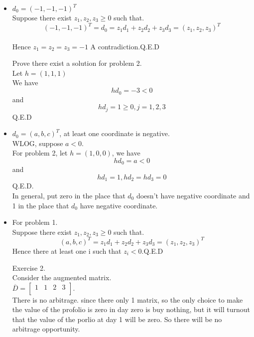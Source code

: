 \documentclass[12pt]{article}
\newcommand{\ol}{\overline}
\begin{document}
\begin{itemize}
\item $d_{0} = (-1,-1,-1)^{T}$\\
Suppose there exist $z_{1},z_{2},z_{3} \geq 0$ such that.\\
$$(-1,-1,-1)^{T} = d_{0} = z_{1}d_{1}+z_{2}d_{2}
+z_{3}d_{3} = (z_{1},z_{2},z_{3})^{T}$$\\
Hence $z_{1}=z_{2}=z_{3}=-1$ A contradiction.Q.E.D

Prove there exist a solution for problem 2.\\
Let $h=(1,1,1)$\\
We have
$$hd_{0} = -3<0 $$ and\\
$$hd_{j}  = 1 \geq 0, j =1,2,3 $$Q.E.D

\item $d_{0} = (a,b,c)^{T}$, at least one coordinate is negative.\\
WLOG, suppose $a < 0$.\\
For problem 2, let $h = (1,0,0)$, we have\\
$$hd_{0} = a < 0 $$ and\\
$$hd_{1} = 1, hd_{2} = hd_{3} =0 $$ Q.E.D.\\
In general, put zero in the place that $d_{0} $ doesn't have negative coordinate and 1 in the place that $d_{0} $ have negative coordinate.\\
\item For problem 1.\\
Suppose there exist $z_{1},z_{2},z_{3} \geq 0$ such that.\\
$$(a,b,c)^{T} = z_{1}d_{1}+z_{2}d_{2}+z_{3}d_{3}= (z_{1},z_{2},z_{3})^{T}$$
Hence there at least one i such that $z_{i}<0$.Q.E.D


















Exercise 2.\\
 Consider the augmented matrix.\\
 
  $\ol{D}=
    \left[\begin{array}{llll}
    1 & 1 & 2 & 3\\
    \end{array}
    \right].$ 
    \\
    
    There is no arbitrage. since there only 1 matrix, so the only choice to make the value of the profolio is zero in day zero is buy nothing, but it will turnout that the value of the porlio at day 1 will be zero. So there will be no arbitrage opportunity.\\
    

\end{itemize}
\end{document}
